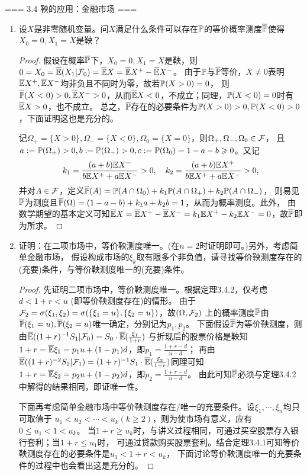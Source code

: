 === 3.4 鞅的应用：金融市场 ===
\begin{enumerate}
    \item[3.4.1] 设$X$是非零随机变量。问$X$满足什么条件可以存在$\P$的等价概率测度$\bP$使得$X_0=0,X_1=X$是鞅？
    \begin{proof}
        假设在概率$\bP$下，$X_0=0,X_1=X$是鞅，则$0=X_0=\bE(X_1|\F_0)=\bE X=\bE X^+-\bE X^-$。
        由于$\P$与$\bP$等价，$X\neq0$表明$\bE X^+,\bE X^-$均非负且不同时为零，故若$\P(X>0)=0$，
        则$\bP(X<0)>0,\bE X^->0$，从而$\bE X<0$，不成立；同理，$\P(X<0)=0$时有$\bE X>0$，也不成立。
        总之，$\bP$存在的必要条件为$\P(X>0)>0,\P(X<0)>0$，下面证明这也是充分的。

        记$\Omega_+=\{X>0\},\Omega_-=\{X<0\},\Omega_0=\{X=0\}$，则$\Omega_+,\Omega_-,\Omega_0\in\F$，
        且$a:=\P(\Omega_+)>0,b:=\P(\Omega_-)>0,c:=\P(\Omega_0)=1-a-b\geqslant0$。又记
        \[k_1=\frac{(a+b)\E X^-}{b\E X^++a\E X^-}>0,\quad k_2=\frac{(a+b)\E X^+}{b\E X^++a\E X^-}>0,\]
        并对$A\in\F$，定义$\bP(A)=\P(A\cap\Omega_0)+k_1\P(A\cap\Omega_+)+k_2\P(A\cap\Omega_-)$，
        则易见$\bP$为测度且$\bP(\Omega)=(1-a-b)+k_1a+k_2b=1$，从而为概率测度。此外，
        由数学期望的基本定义可知$\bE X=\bE X^+-\bE X^-=k_1\E X^+-k_2\E X^-=0$，故$\bP$即为所求。
    \end{proof}
    \item[3.4.2] 证明：在二项市场中，等价鞅测度唯一。(在$n=2$时证明即可。)另外，考虑简单金融市场，
    假设构成市场的$\xi_k$取有限多个非负值，请寻找等价鞅测度存在的(充要)条件，与等价鞅测度唯一的(充要)条件。
    \begin{proof}
        先证明二项市场中，等价鞅测度唯一。根据定理3.4.2，仅考虑$d<1+r<u$ (即等价鞅测度存在)的情形。
        由于$\F_2=\sigma(\xi_1,\xi_2)=\sigma(\{\xi_1=u\},\{\xi_2=u\})$，故$(\Omega,\F_2)$
        上的概率测度$\bP$由$\bP(\xi_1=u),\bP(\xi_2=u)$唯一确定，分别记为$p_1,p_2$。
        下面假设$\bP$为等价鞅测度，则由$\bE((1+r)^{-1}S_1|\F_0)=S_0\cdot\bE(\frac{\xi_1}{1+r})$
        与折现后的股票价格是鞅知$1+r=\bE\xi_1=p_1 u+(1-p_1)d$，即$p_1=\frac{1+r-d}{u-d}$；
        再由$\bE((1+r)^{-2}S_2|\F_1)=(1+r)^{-1}S_1\cdot\bE(\frac{\xi_2}{1+r})$同理可知
        $1+r=\bE\xi_2=p_2 u+(1-p_2)d$，即$p_2=\frac{1+r-d}{u-d}$。
        由此可知$\bP$必须与定理3.4.2中解得的结果相同，即证唯一性。

        下面再考虑简单金融市场中等价鞅测度存在$/$唯一的充要条件。设$\xi_1,\cdots,\xi_n$均只可取值于
        $u_1<u_2<\cdots<u_k(k\geqslant2)$，则为使市场有意义，应有$0\leqslant u_1<1<u_k$。
        当$1+r\geqslant u_k$时，与讲义过程相同，可通过买空股票存入银行套利；当$1+r\leqslant u_1$时，
        可通过贷款购买股票套利。结合定理3.4.1可知等价鞅测度存在的必要条件是$u_1<1+r<u_k$，
        下面讨论等价鞅测度唯一的充要条件的过程中也会看出这是充分的。


\end{proof}
\end{enumerate}
